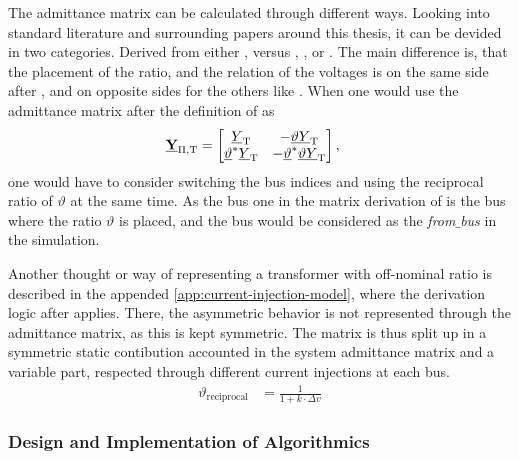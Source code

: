 The admittance matrix can be calculated through different ways.
Looking into standard literature and surrounding papers around this thesis, it can be devided in two categories.
Derived from either \textcite{machowski_2020}, versus \textcite{kundur_2022}, \textcite{milano_2010}, or \textcite{burlakin_2024}.
The main difference is, that the placement of the ratio, and the relation of the voltages is on the same side after \textcite{machowski_2020}, and on opposite sides for the others like \textcite{burlakin_2024}.
When one would use the admittance matrix after the definition of \textcite{machowski_2020} as
\begin{align}
        \underline{\mathrm{\textbf{Y}}}_\mathrm{\Pi,T}&= 
        \begin{bmatrix}
            \underline{Y}_\mathrm{T} & -\underline{\vartheta}\underline{Y}_\mathrm{T} \\
            \underline{\vartheta}^*\underline{Y}_\mathrm{T} & -\underline{\vartheta}^*\underline{\vartheta}\underline{Y}_\mathrm{T}
        \end{bmatrix}, \label{eq:admittance-oltc}
\end{align}
one would have to consider switching the bus indices and using the reciprocal ratio of $\vartheta$ at the same time.
As the bus one in the matrix derivation of \textcite{machowski_2020} is the bus where the ratio $\vartheta$ is placed, and the bus would be considered as the \textit{from$\_$bus} in the simulation.

Another thought or way of representing a transformer with off-nominal ratio is described in the appended \autoref{app:current-injection-model}, where the derivation logic after \textcite{machowski_2020} applies.
There, the asymmetric behavior is not represented through the admittance matrix, as this is kept symmetric. 
The matrix is thus split up in a symmetric static contibution accounted in the system admittance matrix and a variable part, respected through different current injections at each bus. 
\begin{align}
        \vartheta_\mathrm{reciprocal} &= \frac{1}{1 + k \cdot \Delta v} \label{eq:tap-ratio-lv}
\end{align}

\subsubsection{Design and Implementation of Algorithmics}


